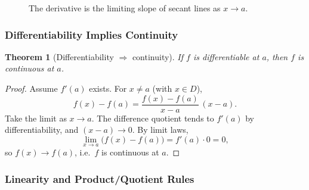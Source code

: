 \documentclass[12pt]{article}
\numberwithin{equation}{section}
\theoremstyle{plain}
\newtheorem{theorem}{Theorem}[section]
\theoremstyle{definition}
\theoremstyle{remark}
\begin{document}
\begin{figure}[H]
\centering
{}
\caption{The derivative is the limiting slope of secant lines as $x\to a$.}
\end{figure}

\subsubsection{Differentiability Implies Continuity}

\begin{theorem}[Differentiability $\Rightarrow$ continuity]\label{thm:diff-implies-cont}
If $f$ is differentiable at $a$, then $f$ is continuous at $a$.
\end{theorem}

\begin{proof}
Assume $f'(a)$ exists. For $x\neq a$ (with $x\in D$),
\[
f(x)-f(a) = \frac{f(x)-f(a)}{x-a}\,(x-a).
\]
Take the limit as $x\to a$.
The difference quotient tends to $f'(a)$ by differentiability, and $(x-a)\to 0$.
By limit laws,
\[
\lim_{x\to a}\bigl(f(x)-f(a)\bigr) = f'(a)\cdot 0 = 0,
\]
so $f(x)\to f(a)$, i.e.\ $f$ is continuous at $a$.
\end{proof}

\subsubsection{Linearity and Product/Quotient Rules}
\end{document}
